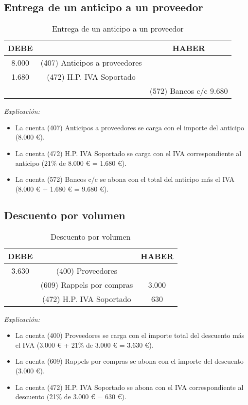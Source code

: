 \documentclass{article}
\begin{document}
\subsection*{Entrega de un anticipo a un proveedor}

\begin{table}[H]
\centering
\begin{tabular}{|c|c|c|}
\hline
\textbf{DEBE} & & \textbf{HABER} \\
\hline
8.000 & (407) Anticipos a proveedores & \\
1.680 & (472) H.P. IVA Soportado & \\
 & & (572) Bancos c/c 9.680 \\
\hline
\end{tabular}
\caption{Entrega de un anticipo a un proveedor}
\end{table}

\textit{Explicación:} 
\begin{itemize}
    \item La cuenta (407) Anticipos a proveedores se carga con el importe del anticipo (8.000 €).
    \item La cuenta (472) H.P. IVA Soportado se carga con el IVA correspondiente al anticipo (21\% de 8.000 € = 1.680 €).
    \item La cuenta (572) Bancos c/c se abona con el total del anticipo más el IVA (8.000 € + 1.680 € = 9.680 €).
\end{itemize}

\subsection*{Descuento por volumen}

\begin{table}[H]
\centering
\begin{tabular}{|c|c|c|}
\hline
\textbf{DEBE} & & \textbf{HABER} \\
\hline
3.630 & (400) Proveedores & \\
 & (609) Rappels por compras & 3.000 \\
 & (472) H.P. IVA Soportado & 630 \\
\hline
\end{tabular}
\caption{Descuento por volumen}
\end{table}

\textit{Explicación:} 
\begin{itemize}
    \item La cuenta (400) Proveedores se carga con el importe total del descuento más el IVA (3.000 € + 21\% de 3.000 € = 3.630 €).
    \item La cuenta (609) Rappels por compras se abona con el importe del descuento (3.000 €).
    \item La cuenta (472) H.P. IVA Soportado se abona con el IVA correspondiente al descuento (21\% de 3.000 € = 630 €).
\end{itemize}
\end{document}
